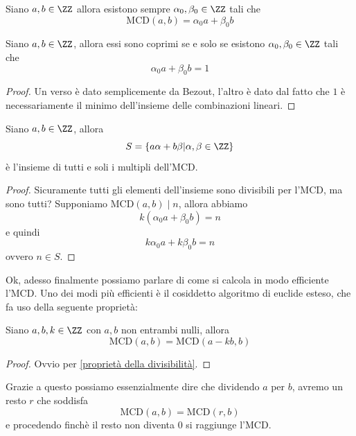\documentclass[11pt]{scrartcl}
\begin{document}
	\begin{corollary}[Bézout]
		Siano $a,b\in\ZZ$ allora esistono sempre $\alpha_0,\beta_0\in\ZZ$ tali che
		$$\text{MCD}(a,b)=\alpha_0a+\beta_0b$$
	\end{corollary}
	\begin{corollary}
		Siano $a,b\in\ZZ$, allora essi sono coprimi se e solo se esistono $\alpha_0,\beta_0\in\ZZ$ tali che
		$$\alpha_0a+\beta_0b=1$$
	\end{corollary}
	\begin{proof}
		Un verso è dato semplicemente da Bezout, l'altro è dato dal fatto che $1$ è necessariamente il minimo dell'insieme delle combinazioni lineari. 
	\end{proof}
	\begin{corollary}\label{soluzioni di una diofantea lineare}
		Siano $a,b\in\ZZ$, allora 
		$$S=\left\{a\alpha+b\beta|\alpha,\beta\in\ZZ\right\}$$
		è l'insieme di tutti e soli i multipli dell'MCD.
	\end{corollary}
	\begin{proof}
		Sicuramente tutti gli elementi dell'insieme sono divisibili per l'MCD, ma sono tutti? Supponiamo $\text{MCD}(a,b)\mid n$, allora abbiamo 
		$$k(\alpha_0a+\beta_0b)=n$$
		e quindi 
		$$k\alpha_0a+k\beta_0b=n$$
		ovvero $n\in S$.
	\end{proof}
	Ok, adesso finalmente possiamo parlare di come si calcola in modo efficiente l'MCD. Uno dei modi più efficienti è il cosiddetto algoritmo di euclide esteso, che fa uso della seguente proprietà:
	\begin{lemma}
		Siano $a,b,k\in\ZZ$ con $a,b$ non entrambi nulli, allora
		$$\text{MCD}(a,b)=\text{MCD}(a-kb,b)$$
	\end{lemma}
	\begin{proof}
		Ovvio per \ref{proprietà della divisibilità}.
	\end{proof}
	Grazie a questo possiamo essenzialmente dire che dividendo $a$ per $b$, avremo un resto $r$ che soddisfa
	$$\text{MCD}(a,b)=\text{MCD}(r,b)$$
	e procedendo finchè il resto non diventa $0$ si raggiunge l'MCD.
	
\end{document}
